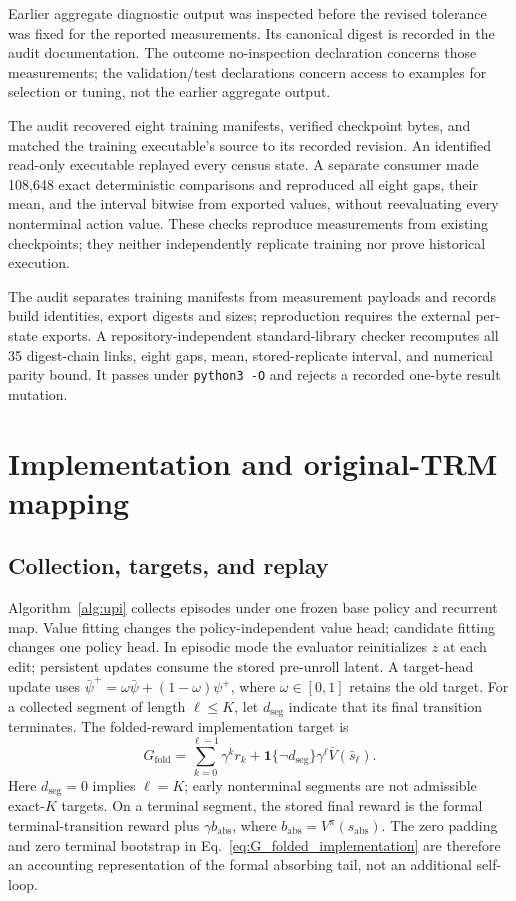 \documentclass{article}
\theoremstyle{plain}
\theoremstyle{definition}
\theoremstyle{remark}
\begin{document}
Earlier aggregate diagnostic output was inspected before the revised
tolerance was fixed for the reported measurements. Its canonical digest is
recorded in the audit documentation. The outcome no-inspection declaration
concerns those measurements; the validation/test declarations concern access
to examples for selection or tuning, not the earlier aggregate output.

The audit recovered eight training manifests, verified checkpoint bytes, and
matched the training executable's source to its recorded revision. An
identified read-only executable replayed every census state. A separate
consumer made 108,648 exact deterministic comparisons and reproduced all
eight gaps, their mean, and the interval bitwise from exported values,
without reevaluating every nonterminal action value. These checks reproduce
measurements from existing checkpoints; they neither independently replicate
training nor prove historical execution.

The audit separates training manifests from measurement payloads and records
build identities, export digests and sizes; reproduction requires the external
per-state exports. A repository-independent standard-library checker
recomputes all 35 digest-chain links, eight gaps, mean, stored-replicate
interval, and numerical parity bound. It passes under \texttt{python3 -O}
and rejects a recorded one-byte result mutation.

\section{Implementation and original-TRM mapping}
\label{app:implementation}

\subsection{Collection, targets, and replay}
\label{app:algorithm_pseudocode}

Algorithm~\ref{alg:upi} collects episodes under one frozen base policy and
recurrent map. Value fitting changes the policy-independent value head;
candidate fitting changes one policy head. In episodic mode the evaluator
reinitializes $z$ at each edit; persistent updates consume the stored
pre-unroll latent. A target-head update uses
$\bar\psi^+=\omega\bar\psi+(1-\omega)\psi^+$, where $\omega\in[0,1]$ retains
the old target.
For a collected segment of length $\ell\le K$, let $d_{\mathrm{seg}}$ indicate
that its final transition terminates. The folded-reward implementation target is
\begin{equation}
G_{\mathrm{fold}}
=
\sum_{k=0}^{\ell-1}\gamma^k r_k
+
\mathbf{1}\{\neg d_{\mathrm{seg}}\}\gamma^\ell\bar V(\bar s_\ell).
\label{eq:G_folded_implementation}
\end{equation}
Here $d_{\mathrm{seg}}=0$ implies $\ell=K$; early nonterminal segments are not
admissible exact-$K$ targets. On a terminal segment, the stored final reward is
the formal terminal-transition reward plus $\gamma b_{\mathrm{abs}}$, where
$b_{\mathrm{abs}}=V^\pi(s_{\mathrm{abs}})$. The zero padding and zero terminal bootstrap in
Eq.~\eqref{eq:G_folded_implementation} are therefore an accounting
representation of the formal absorbing tail, not an additional self-loop.
\end{document}
